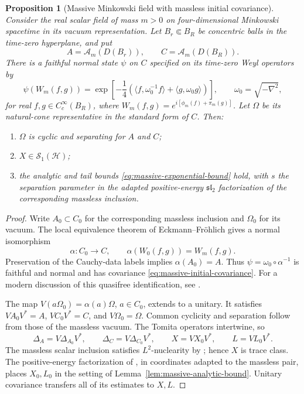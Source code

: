 \documentclass[a4paper,11pt]{article}
\newtheorem{proposition}[theorem]{Proposition}
\theoremstyle{definition}
\begin{document}
\begin{proposition}[Massive Minkowski field with massless initial covariance]
\label{prop:massive-minkowski}
Consider the real scalar field of mass $m>0$ on four-dimensional Minkowski
spacetime in its vacuum representation. Let $B_r\Subset B_R$ be concentric
balls in the time-zero hyperplane, and put
\[
 A=\mathcal A_m(D(B_r)),\qquad C=\mathcal A_m(D(B_R)).
\]
There is a faithful normal state $\psi$ on $C$ specified on its time-zero Weyl
operators by
\begin{equation}
 \psi(W_m(f,g))=
 \exp\left[-\frac14\left(
 \langle f,\omega_0^{-1}f\rangle+
 \langle g,\omega_0g\rangle\right)\right],\qquad
 \omega_0=\sqrt{-\nabla^2},
 \label{eq:massive-initial-covariance}
\end{equation}
for real $f,g\in C_c^\infty(B_R)$, where
$W_m(f,g)=e^{i[\phi_m(f)+\pi_m(g)]}$. Let $\Omega$ be its natural-cone
representative in the standard form of $C$. Then:
\begin{enumerate}
 \item $\Omega$ is cyclic and separating for $A$ and $C$;
 \item $X\in\mathcal S_1(\mathcal H)$;
 \item the analytic and tail bounds \eqref{eq:massive-exponential-bound} hold,
 with $s$ the separation parameter in the adapted positive-energy
 $\mathfrak{sl}_2$ factorization of the corresponding massless inclusion.
\end{enumerate}
\end{proposition}
\begin{proof}
Write $A_0\subset C_0$ for the corresponding massless inclusion and $\Omega_0$
for its vacuum. The local equivalence theorem of Eckmann--Fr\"ohlich
\cite[Theorem~5.1]{EF1974} gives a normal isomorphism
\[
 \alpha:C_0\longrightarrow C,\qquad
 \alpha(W_0(f,g))=W_m(f,g).
\]
Preservation of the Cauchy-data labels implies $\alpha(A_0)=A$. Thus
$\psi=\omega_0\circ\alpha^{-1}$ is faithful and normal and has covariance
\eqref{eq:massive-initial-covariance}. For a modern discussion of this
quasifree identification, see \cite[Section~3.1]{CM2024}.

The map $V(a\Omega_0)=\alpha(a)\Omega$, $a\in C_0$, extends to a unitary.
It satisfies $VA_0V^*=A$, $VC_0V^*=C$, and $V\Omega_0=\Omega$.
Common cyclicity and separation follow from those of the massless vacuum.
The Tomita operators intertwine, so
\[
 \Delta_A=V\Delta_{A_0}V^*,\qquad
 \Delta_C=V\Delta_{C_0}V^*,\qquad
 X=VX_0V^*,\qquad L=VL_0V^*.
\]
The massless scalar inclusion satisfies $L^2$-nuclearity by
\cite[Corollary~8.5]{BDL2007}; hence $X$ is trace class.
The positive-energy factorization of \cite[Proposition~3.1]{BDL2007}, in
coordinates adapted to the massless pair, places $X_0,L_0$ in the setting of
Lemma~\ref{lem:massive-analytic-bound}. Unitary covariance transfers all of
its estimates to $X,L$.
\end{proof}
\end{document}
